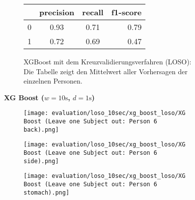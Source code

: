 \begin{figure}[H]
    \begin{subfigure}{1\textwidth}
        \begin{center}
            \begin{tabular}{ | l | c | c | r | }
              \hline
               & precision & recall & f1-score \\ \hline
              0 & 0.93 & 0.71 & 0.79 \\ \hline
              1 & 0.72 & 0.69 & 0.47 \\
              \hline
            \end{tabular}
        \end{center}
        \caption{XGBoost mit dem Kreuzvalidierungsverfahren (LOSO): Die Tabelle zeigt den Mittelwert aller Vorhersagen der einzelnen Personen.}
        \label{implementation:app:screenshots:user_studies_information}
    \end{subfigure}
    \newline
    \vspace*{1 cm}
    \newline
    \textbf{XG Boost ($w=10\si{\s}$, $d=1\si{\s}$)}
    \begin{subfigure}{1\textwidth}
      \texttt{[image: evaluation/loso\_10sec/xg\_boost\_loso/XG Boost (Leave one Subject out: Person 6 back).png]}
    \end{subfigure}
    \begin{subfigure}{1\textwidth}
      \texttt{[image: evaluation/loso\_10sec/xg\_boost\_loso/XG Boost (Leave one Subject out: Person 6 side).png]}
    \end{subfigure}
    \begin{subfigure}{1\textwidth}
      \texttt{[image: evaluation/loso\_10sec/xg\_boost\_loso/XG Boost (Leave one Subject out: Person 6 stomach).png]}
  \end{subfigure}


\end{figure}

